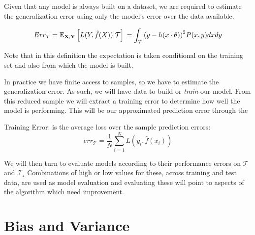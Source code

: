 Given that any model is always built on a dataset, we are required to estimate the generalization error using only the model's error over the data available.


\begin{equation}
	Err_{\mathcal{T}} = \operatorname{\mathbb{E}}_{\textbf{X},\textbf{Y}} \left[ L(Y,\hat{f}(X)) | \mathcal{T}\right] \\
	= \int_{\mathcal{T}} {(y - h(x \cdot \theta) )}^2 P(x,y)dxdy
\end{equation}


Note that in this definition the expectation is taken conditional on the training set and also from which the model is built.


In practice we have finite access to samples, so we have to estimate the generalization error.
As such, we will have data to build or \textit{train} our model.
From this reduced sample we will extract a training error to determine how well the model is performing.
This will be our approximated prediction error through the
\begin{definition}{Training Error:}
	is the average loss over the sample prediction errors:
	$$ \overline{err}_{\mathcal{T}} = \frac{1}{N} \sum_{i=1}^N L(y_i, \hat{f}(x_i) )$$
\end{definition}\label{def:trainingError}


We will then turn to evaluate models according to their performance errors on $\mathcal{T}$ and $\mathcal{T_s}$ Combinations of high or low values for these, across training and test data, are used as model evaluation and evaluating these will point to aspects of the algorithm which need improvement.

\section{Bias and Variance}\label{section-biasVariance}

